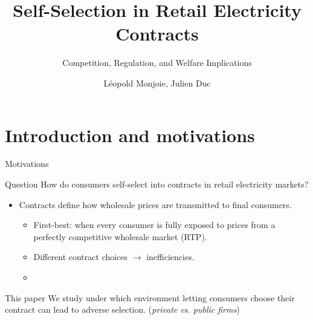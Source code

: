 \documentclass{class}
\title{Self-Selection in Retail Electricity Contracts}
\subtitle{Competition, Regulation, and Welfare Implications}
\author{Léopold Monjoie, Julien Duc}
\institute{Aalto University \and Université Paris Dauphine, PSL Research University, LEDa}
\begin{document}
\newlength{\tempb}

\frame{\titlepage}

\newcommand{\commentedbox}[2]{%
  \mbox{
    \begin{tabular}[t]{@{}c@{}}
    $\boxed{\displaystyle#1}$\\
    #2
    \end{tabular}%
  }%
}

\newcommand\Wider[2][3em]{%
\makebox[\linewidth][c]{%
  \begin{minipage}{\dimexpr\textwidth+#1\relax}
  \raggedright#2
  \end{minipage}%
  }%
}

\newcommand*\circled[1]{\tikz[baseline=(char.base)]{
            \node[shape=circle,draw,inner sep=2pt] (char) {#1};}}



\section{Introduction and motivations}


\begin{frame}{Motivations}\label{Motivations}

\begin{mainbox}{Question}
How do consumers self-select into contracts in retail electricity markets?
\end{mainbox}

\vfill

\begin{itemize}
    \item Contracts define how wholesale prices are transmitted to final consumers. \vfill
\begin{itemize}
    \item First-best: when every consumer is fully exposed to prices from a perfectly competitive wholesale market (RTP). \vfill
    \item Different contract choices $\rightarrow$ inefficiencies.\vfill
    \item \hyperlink{Lit_FB}{} \vfill
\end{itemize}

\end{itemize}

\begin{mainbox}{This paper}
We study under which environment letting consumers choose their contract can lead to adverse selection. (\textit{private vs. public firms})
\end{mainbox}
       
\end{frame}
\end{document}
